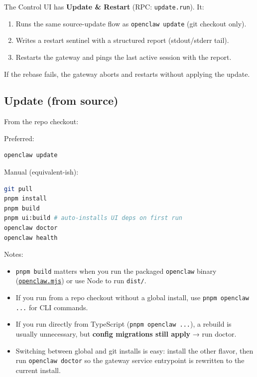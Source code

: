 The Control UI has \textbf{Update \& Restart} (RPC: \texttt{update.run}). It:

\begin{enumerate}
  \item Runs the same source-update flow as \texttt{openclaw update} (git checkout only).
  \item Writes a restart sentinel with a structured report (stdout/stderr tail).
  \item Restarts the gateway and pings the last active session with the report.
\end{enumerate}


If the rebase fails, the gateway aborts and restarts without applying the update.

\subsection{Update (from source)}


From the repo checkout:

Preferred:

\begin{lstlisting}[language=bash]
openclaw update
\end{lstlisting}


Manual (equivalent-ish):

\begin{lstlisting}[language=bash]
git pull
pnpm install
pnpm build
pnpm ui:build # auto-installs UI deps on first run
openclaw doctor
openclaw health
\end{lstlisting}


Notes:

\begin{itemize}
  \item \texttt{pnpm build} matters when you run the packaged \texttt{openclaw} binary (\href{https://github.com/openclaw/openclaw/blob/main/openclaw.mjs}{\texttt{openclaw.mjs}}) or use Node to run \texttt{dist/}.
  \item If you run from a repo checkout without a global install, use \texttt{pnpm openclaw ...} for CLI commands.
  \item If you run directly from TypeScript (\texttt{pnpm openclaw ...}), a rebuild is usually unnecessary, but \textbf{config migrations still apply} → run doctor.
  \item Switching between global and git installs is easy: install the other flavor, then run \texttt{openclaw doctor} so the gateway service entrypoint is rewritten to the current install.
\end{itemize}


